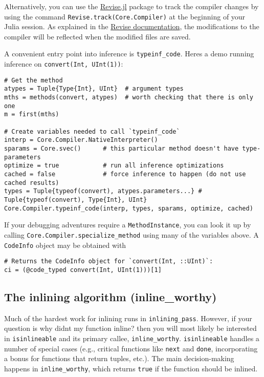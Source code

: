Alternatively, you can use the \href{https://github.com/timholy/Revise.jl}{Revise.jl} package to track the compiler changes by using the command \texttt{Revise.track(Core.Compiler)} at the beginning of your Julia session. As explained in the \href{https://timholy.github.io/Revise.jl/stable/}{Revise documentation}, the modifications to the compiler will be reflected when the modified files are saved.



A convenient entry point into inference is \texttt{typeinf\_code}. Here{\textquotesingle}s a demo running inference on \texttt{convert(Int, UInt(1))}:




\begin{verbatim}
# Get the method
atypes = Tuple{Type{Int}, UInt}  # argument types
mths = methods(convert, atypes)  # worth checking that there is only one
m = first(mths)

# Create variables needed to call `typeinf_code`
interp = Core.Compiler.NativeInterpreter()
sparams = Core.svec()      # this particular method doesn't have type-parameters
optimize = true            # run all inference optimizations
cached = false             # force inference to happen (do not use cached results)
types = Tuple{typeof(convert), atypes.parameters...} # Tuple{typeof(convert), Type{Int}, UInt}
Core.Compiler.typeinf_code(interp, types, sparams, optimize, cached)
\end{verbatim}



If your debugging adventures require a \texttt{MethodInstance}, you can look it up by calling \texttt{Core.Compiler.specialize\_method} using many of the variables above. A \texttt{CodeInfo} object may be obtained with




\begin{verbatim}
# Returns the CodeInfo object for `convert(Int, ::UInt)`:
ci = (@code_typed convert(Int, UInt(1)))[1]
\end{verbatim}



\hypertarget{3650644351684738912}{}


\subsection{The inlining algorithm (inline\_worthy)}



Much of the hardest work for inlining runs in \texttt{inlining\_pass}. However, if your question is {\textquotedbl}why didn{\textquotesingle}t my function inline?{\textquotedbl} then you will most likely be interested in \texttt{isinlineable} and its primary callee, \texttt{inline\_worthy}. \texttt{isinlineable} handles a number of special cases (e.g., critical functions like \texttt{next} and \texttt{done}, incorporating a bonus for functions that return tuples, etc.). The main decision-making happens in \texttt{inline\_worthy}, which returns \texttt{true} if the function should be inlined.



